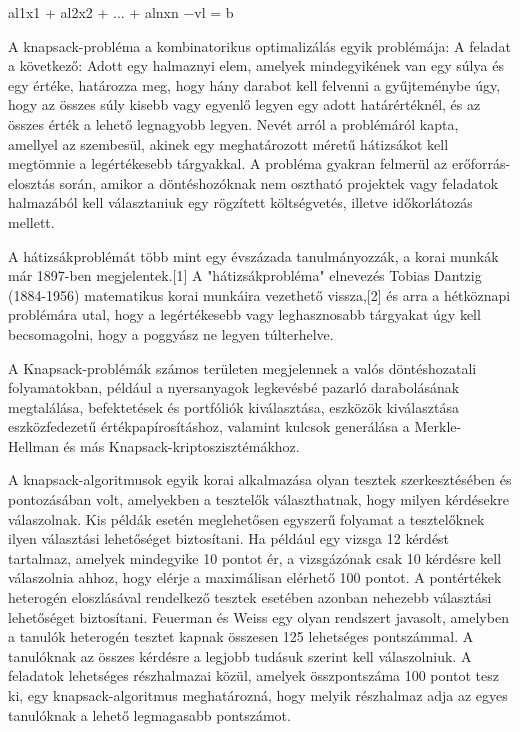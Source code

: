 al1x1 + al2x2 + ... + alnxn −vl = b

	
	
	A knapsack-probléma a kombinatorikus optimalizálás egyik problémája: A feladat a következő: Adott egy halmaznyi elem, amelyek mindegyikének van egy súlya és egy értéke, határozza meg, hogy hány darabot kell felvenni a gyűjteménybe úgy, hogy az összes súly kisebb vagy egyenlő legyen egy adott határértéknél, és az összes érték a lehető legnagyobb legyen. Nevét arról a problémáról kapta, amellyel az szembesül, akinek egy meghatározott méretű hátizsákot kell megtömnie a legértékesebb tárgyakkal. A probléma gyakran felmerül az erőforrás-elosztás során, amikor a döntéshozóknak nem osztható projektek vagy feladatok halmazából kell választaniuk egy rögzített költségvetés, illetve időkorlátozás mellett.
	
	A hátizsákproblémát több mint egy évszázada tanulmányozzák, a korai munkák már 1897-ben megjelentek.[1] A "hátizsákprobléma" elnevezés Tobias Dantzig (1884-1956) matematikus korai munkáira vezethető vissza,[2] és arra a hétköznapi problémára utal, hogy a legértékesebb vagy leghasznosabb tárgyakat úgy kell becsomagolni, hogy a poggyász ne legyen túlterhelve. 
	
	
	A Knapsack-problémák számos területen megjelennek a valós döntéshozatali folyamatokban, például a nyersanyagok legkevésbé pazarló darabolásának megtalálása, befektetések és portfóliók kiválasztása, eszközök kiválasztása eszközfedezetű értékpapírosításhoz, valamint kulcsok generálása a Merkle-Hellman és más Knapsack-krip\-to\-szisz\-té\-mák\-hoz.
	
	A knapsack-algoritmusok egyik korai alkalmazása olyan tesztek szerkesztésében és pontozásában volt, amelyekben a tesztelők választhatnak, hogy milyen kérdésekre válaszolnak. Kis példák esetén meglehetősen egyszerű folyamat a tesztelőknek ilyen választási lehetőséget biztosítani. Ha például egy vizsga 12 kérdést tartalmaz, amelyek mindegyike 10 pontot ér, a vizsgázónak csak 10 kérdésre kell válaszolnia ahhoz, hogy elérje a maximálisan elérhető 100 pontot. A pontértékek heterogén eloszlásával rendelkező tesztek esetében azonban nehezebb választási lehetőséget biztosítani. Feuerman és Weiss egy olyan rendszert javasolt, amelyben a tanulók heterogén tesztet kapnak összesen 125 lehetséges pontszámmal. A tanulóknak az összes kérdésre a legjobb tudásuk szerint kell válaszolniuk. A feladatok lehetséges részhalmazai közül, amelyek összpontszáma 100 pontot tesz ki, egy knapsack-algoritmus meghatározná, hogy melyik részhalmaz adja az egyes tanulóknak a lehető legmagasabb pontszámot.
	
